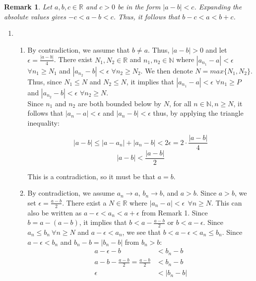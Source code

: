 \documentclass{article}
\newtheorem{remark}{Remark}
\begin{document}
\begin{remark}
Let $a, b, c \in \mathbb{R}$ and $c > 0$ be in the form $|a-b| < c$. Expanding the absolute values gives $-c < a - b < c$. Thus, it follows that $b - c < a < b + c$.

\end{remark}

\begin{enumerate}

  \item

    \begin{enumerate}[label=\alph*)]

      \item 
      By contradiction, we assume that $b \neq a$. Thus, $|a - b| > 0$ and let $\epsilon = \frac{|a-b|}{4}$. There exist $N_1, N_2 \in \mathbb{R}$ and $n_1, n_2 \in \mathbb{N}$ where $|a_{n_1} - a| < \epsilon$ $\forall n_1 \geq N_1$ and $|a_{n_2} - b| < \epsilon$ $\forall n_2 \geq N_2$. We then denote $N = max\{N_1, N_2\}$. Thus, since $N_1 \leq N$ and $N_2 \leq N$, it implies that $|a_{n_1} - a| < \epsilon$ $\forall n_1 \geq P$ and $|a_{n_2} - b| < \epsilon$ $\forall n_2 \geq N$. \\

      Since $n_1$ and $n_2$ are both bounded below by $N$, for all $n \in \mathbb{N}, n \geq N$, it follows that $|a_n - a| < \epsilon$ and $|a_n - b| < \epsilon$ thus, by applying the triangle inequality: 
      
      $$|a -b| \leq |a - a_n| + |a_n - b| < 2\epsilon = 2 \cdot \frac{|a-b|}{4}$$
      $$|a - b| < \frac{|a-b|}{2}$$
      
      This is a contradiction, so it must be that $a = b$.\\
    
      \item
      By contradiction, we assume $a_n \rightarrow a$, $b_n \rightarrow b$, and $a > b$. Since $a > b$, we set $\epsilon = \frac{a - b}{2}$. There exist a $N \in \mathbb{R}$ where $|a_n - a| < \epsilon \ \ \forall n \geq N$. This can also be written as $a - \epsilon < a_{n} < a + \epsilon$ from Remark 1. Since $b = a - (a - b)$, it implies that $b < a - \frac{a - b}{2}$ or $b < a - \epsilon$. Since $a_n \leq b_n \ \forall n \geq N$ and $a - \epsilon < a_n$, we see that $b < a - \epsilon< a_n \leq b_n$. Since $a - \epsilon < b_n$ and $b_n - b = |b_n - b|$ from $b_n > b$: 
      \begin{align*}
          a - \epsilon - b &< b_n - b  \\
          a - b - \frac{a - b}{2} = \frac{a - b}{2} &< b_n - b \\
          \epsilon &< |b_n - b| 
      \end{align*}
      

\end{enumerate}
\end{enumerate}
\end{document}

